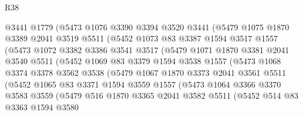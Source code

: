 \begin{lexlean}{R38}
\begin{coremodule}
              @3441
              @1779
              (@5473
                @1076
                @3390
                @3394
                @3520
                @3441
                (@5479
                  @1075
                  @1870
                  @3389
                  @2041
                  @3519
                  @5511
                  (@5452
                    @1073
                    @83
                    @3387
                    @1594
                    @3517
                    @1557
                    (@5473
                      @1072
                      @3382
                      @3386
                      @3541
                      @3517
                      (@5479
                        @1071
                        @1870
                        @3381
                        @2041
                        @3540
                        @5511
                        (@5452
                          @1069
                          @83
                          @3379
                          @1594
                          @3538
                          @1557
                          (@5473
                            @1068
                            @3374
                            @3378
                            @3562
                            @3538
                            (@5479
                              @1067
                              @1870
                              @3373
                              @2041
                              @3561
                              @5511
                              (@5452
                                @1065
                                @83
                                @3371
                                @1594
                                @3559
                                @1557
                                (@5473
                                  @1064
                                  @3366
                                  @3370
                                  @3583
                                  @3559
                                  (@5479
                                    @516
                                    @1870
                                    @3365
                                    @2041
                                    @3582
                                    @5511
                                    (@5452
                                      @514
                                      @83
                                      @3363
                                      @1594
                                      @3580

\end{coremodule}
\end{lexlean}
